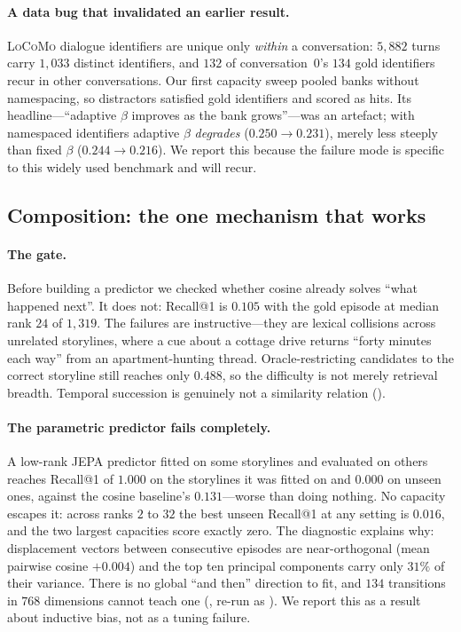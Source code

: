 \paragraph{A data bug that invalidated an earlier result.} \textsc{LoCoMo} dialogue
identifiers are unique only \emph{within} a conversation: $5{,}882$ turns carry $1{,}033$
distinct identifiers, and $132$ of conversation~0's $134$ gold identifiers recur in other
conversations. Our first capacity sweep pooled banks without namespacing, so distractors
satisfied gold identifiers and scored as hits. Its headline---``adaptive $\beta$ improves as
the bank grows''---was an artefact; with namespaced identifiers adaptive $\beta$ \emph{degrades}
($0.250 \to 0.231$), merely less steeply than fixed $\beta$ ($0.244 \to 0.216$). We report
this because the failure mode is specific to this widely used benchmark and will recur.

\subsection{Composition: the one mechanism that works}
\label{sec:composition}

\paragraph{The gate.} Before building a predictor we checked whether cosine already solves
``what happened next''. It does not: Recall@1 is $0.105$ with the gold episode at median rank
$24$ of $1{,}319$. The failures are instructive---they are lexical collisions across
unrelated storylines, where a cue about a cottage drive returns ``forty minutes each way''
from an apartment-hunting thread. Oracle-restricting candidates to the correct storyline
still reaches only $0.488$, so the difficulty is not merely retrieval breadth. Temporal
succession is genuinely not a similarity relation ().

\paragraph{The parametric predictor fails completely.} A low-rank JEPA predictor fitted on
some storylines and evaluated on others reaches Recall@1 of $1.000$ on the storylines it was
fitted on and $0.000$ on unseen ones, against the cosine baseline's $0.131$---worse
than doing nothing. No capacity escapes it: across ranks $2$ to $32$ the best unseen
Recall@1 at any setting is $0.016$, and the two largest capacities score exactly zero.
The diagnostic explains why: displacement vectors between consecutive episodes are
near-orthogonal (mean pairwise cosine $+0.004$) and the top ten principal
components carry only $31\%$ of their variance. There is no global ``and then''
direction to fit, and $134$ transitions in $768$ dimensions cannot teach one
(, re-run as ). We report this as a result about inductive bias, not as
a tuning failure.

